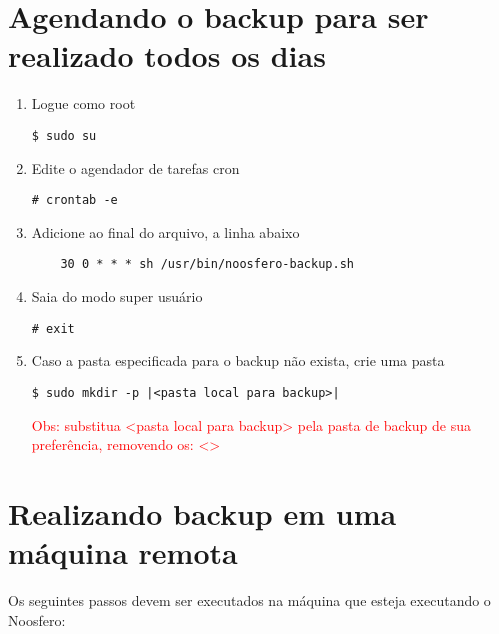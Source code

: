 \section{Agendando o backup para ser realizado todos os dias}

\begin{enumerate}[label=\alph*)]

\item Logue como root
\begin{lstlisting}
$ sudo su
\end{lstlisting}

\item Edite o agendador de tarefas cron
\begin{lstlisting}
# crontab -e
\end{lstlisting}

\item Adicione ao final do arquivo, a linha abaixo
\begin{lstlisting}
	30 0 * * * sh /usr/bin/noosfero-backup.sh
\end{lstlisting}

\item Saia do modo super usuário
\begin{lstlisting}
# exit
\end{lstlisting}

\item Caso a pasta especificada para o backup não exista, crie uma pasta
\begin{lstlisting}[style=base]
$ sudo mkdir -p |<pasta local para backup>|
\end{lstlisting}

\textcolor{red}{{\scriptsize Obs: substitua <pasta local para backup> pela pasta de backup de sua preferência, removendo os: <> }}

\end{enumerate}

\section{Realizando backup em uma máquina remota}

Os seguintes passos devem ser executados na máquina que esteja executando o Noosfero:

